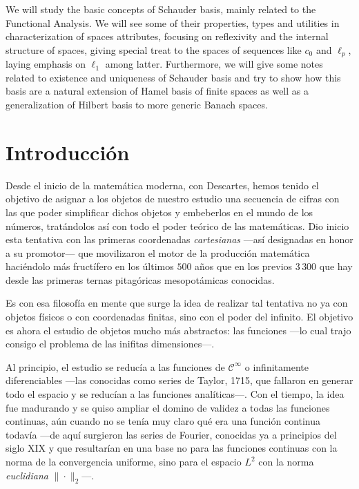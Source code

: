 \documentclass[
  spanish,
  letterpaper,
  DIV=11,
  numbers=noendperiod]{scrreprt}
\theoremstyle{definition}
\theoremstyle{remark}
\theoremstyle{definition}
\theoremstyle{exampstyle}
\theoremstyle{plain}
\theoremstyle{plain}
\theoremstyle{definition}
\theoremstyle{plain}
\theoremstyle{remark}
\begin{document}
We will study the basic concepts of Schauder basis, mainly related to
the Functional Analysis. We will see some of their properties, types and
utilities in characterization of spaces attributes, focusing on
reflexivity and the internal structure of spaces, giving special treat
to the spaces of sequences like \(c_0\) and \(\ell_p\), laying emphasis
on \(\ell_1\) among latter. Furthermore, we will give some notes related
to existence and uniqueness of Schauder basis and try to show how this
basis are a natural extension of Hamel basis of finite spaces as well as
a generalization of Hilbert basis to more generic Banach spaces.

\clearpage

\thispagestyle{empty}


\chapter*{Introducción}\label{introducciuxf3n}


\newline

Desde el inicio de la matemática moderna, con Descartes, hemos tenido el
objetivo de asignar a los objetos de nuestro estudio una secuencia de
cifras con las que poder simplificar dichos objetos y embeberlos en el
mundo de los números, tratándolos así con todo el poder teórico de las
matemáticas. Dio inicio esta tentativa con las primeras coordenadas
\textit{cartesianas} ---así designadas en honor a su promotor--- que
movilizaron el motor de la producción matemática haciéndolo más
fructífero en los últimos \(500\) años que en los previos \(3\,300\) que
hay desde las primeras ternas pitagóricas mesopotámicas conocidas.

Es con esa filosofía en mente que surge la idea de realizar tal
tentativa no ya con objetos físicos o con coordenadas finitas, sino con
el poder del infinito. El objetivo es ahora el estudio de objetos mucho
más abstractos: las funciones ---lo cual trajo consigo el problema de
las inifitas dimensiones---.

Al principio, el estudio se reducía a las funciones de
\(\mathcal{C}^\infty\) o infinitamente diferenciables ---las conocidas
como series de Taylor, 1715, que fallaron en generar todo el espacio y
se reducían a las funciones analíticas---. Con el tiempo, la idea fue
madurando y se quiso ampliar el domino de validez a todas las funciones
continuas, aún cuando no se tenía muy claro qué era una función continua
todavía ---de aquí surgieron las series de Fourier, conocidas ya a
principios del siglo XIX y que resultarían en una base no para las
funciones continuas con la norma de la convergencia uniforme, sino para
el espacio \(L^2\) con la norma \emph{euclidiana}
\(\|\!\cdot\!\|_2\)---.
\end{document}
